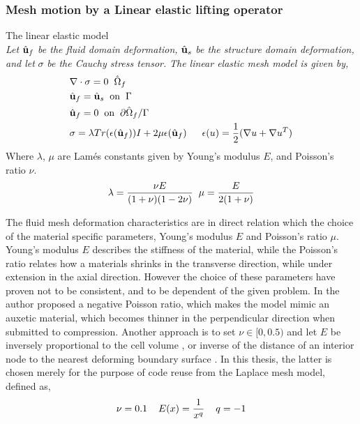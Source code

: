 \subsubsection*{Mesh motion by a Linear elastic lifting operator}
\begin{equat}
The linear elastic model \\ \textit{Let} $\hat{\mathbf{u}}_f$ \textit{be the fluid domain deformation,} $\hat{\mathbf{u}}_s$ \textit{be the structure domain deformation, and let} $\sigma$ \textit{be the Cauchy stress tensor.} \textit{The linear elastic mesh model is given by, }  
\begin{align*}
&\nabla \cdot \sigma = 0 \hspace{2mm} \hat{\Omega}_f\\
&\hat{\mathbf{u}}_f = \hat{\mathbf{u}}_s \hspace{2mm} \text{on} \hspace{2mm} \Gamma \\
&\hat{\mathbf{u}}_f = 0 \hspace{2mm} \text{on} \hspace{2mm} \partial \hat{\Omega}_f / \Gamma \\
&\sigma = \lambda Tr(\epsilon(\hat{\mathbf{u}}_f)) I + 2 \mu \epsilon(\hat{\mathbf{u}}_f) \hspace{2mm}
&\epsilon(u) = \frac{1}{2}(\nabla u + \nabla  u^T)
\end{align*}
Where $\lambda$, $\mu$ are Lamés constants given by Young's modulus $E$, and Poisson's ratio $\nu$.
\begin{align*}
\lambda = \frac{\nu E}{(1 + \nu)(1 - 2\nu)} \hspace{2mm} \mu = \frac{E}{2(1 + \nu)}
\end{align*}
\end{equat}
The fluid mesh deformation characteristics are in direct relation which the choice of the material specific parameters, Young's modulus $E$ and Poisson's ratio $\mu$. Young's modulus $E$ describes the stiffness of the material, while the Poisson's ratio relates how a materials shrinks in the transverse direction, while under extension in the axial direction. However the choice of these parameters have proven not to be consistent, and to be dependent of the given problem.
In \cite{Wicka} the author proposed a negative Poisson ratio, which makes the model mimic an auxetic material, which becomes thinner in the perpendicular direction when submitted to compression. Another approach is to set $\nu \in [0, 0.5)$ and let $E$ be inversely proportional to the cell volume \cite{Biedron}, or inverse of the distance of an interior node to the nearest deforming boundary surface \cite{MM2016}. In this thesis, the latter is chosen merely for the purpose of code reuse from the Laplace mesh model, defined as,
\begin{align*}
\nu = 0.1 \hspace{4mm} E(x) = \frac{1}{x^q} \hspace{4mm} q = -1
\end{align*}
\newpage
